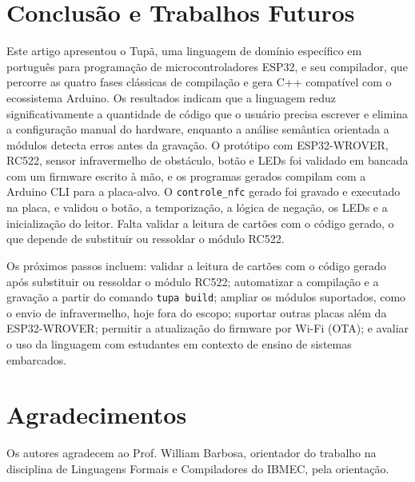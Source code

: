 \documentclass[conference]{IEEEtran}
\begin{document}
\section{Conclusão e Trabalhos Futuros}\label{sec:conclusao}
Este artigo apresentou o Tupã, uma linguagem de domínio específico em
português para programação de microcontroladores ESP32, e seu compilador,
que percorre as quatro fases clássicas de compilação e gera C++ compatível
com o ecossistema Arduino. Os resultados indicam que a
linguagem reduz significativamente a quantidade de código que o usuário
precisa escrever e elimina a configuração manual do hardware, enquanto a
análise semântica orientada a módulos detecta erros antes da gravação. O
protótipo com ESP32-WROVER, RC522, sensor infravermelho de obstáculo, botão e
LEDs foi validado em bancada com um firmware escrito à mão, e os programas
gerados compilam com a Arduino CLI para a placa-alvo. O \texttt{controle\_nfc}
gerado foi gravado e executado na placa, e validou o botão, a temporização, a
lógica de negação, os LEDs e a inicialização do leitor. Falta validar a
leitura de cartões com o código gerado, o que depende de substituir ou
ressoldar o módulo RC522.

Os próximos passos incluem: validar a leitura de cartões com o código gerado
após substituir ou ressoldar o módulo RC522; automatizar a compilação e a gravação a
partir do comando \texttt{tupa build}; ampliar os módulos suportados, como o
envio de infravermelho, hoje fora do escopo; suportar outras placas além da
ESP32-WROVER; permitir a atualização do firmware por Wi-Fi (OTA); e avaliar o
uso da linguagem com estudantes em contexto de ensino de sistemas embarcados.

\section*{Agradecimentos}
Os autores agradecem ao Prof. William Barbosa, orientador do trabalho na
disciplina de Linguagens Formais e Compiladores do IBMEC, pela orientação.
\end{document}
